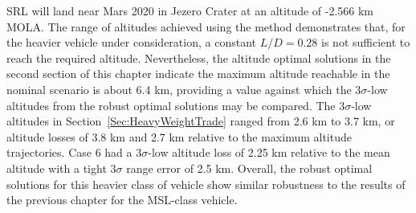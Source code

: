 SRL will land near Mars 2020 in Jezero Crater at an altitude of -2.566 km MOLA. The range of altitudes achieved using the method demonstrates that, for the heavier vehicle under consideration, a constant $ L/D=0.28 $ is not sufficient to reach the required altitude. Nevertheless, the  altitude optimal solutions in the second section of this chapter indicate the maximum altitude reachable in the nominal scenario is about 6.4 km, providing a value against which the 3$\sigma$-low altitudes from the robust optimal solutions may be compared. The 3$\sigma$-low altitudes in Section~\ref{Sec:HeavyWeightTrade} ranged from 2.6 km to 3.7 km, or altitude losses of 3.8 km and 2.7 km relative to the maximum altitude trajectories. Case 6 had a 3$\sigma$-low altitude loss of 2.25 km relative to the mean altitude with a tight 3$\sigma$ range error of 2.5 km. 
Overall, the robust optimal solutions for this heavier class of vehicle show similar robustness to the results of the previous chapter for the MSL-class vehicle. 



